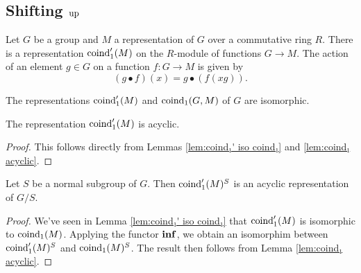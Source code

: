 \subsection{Shifting $\mathrm{up}$}

\begin{definition} \label{def:coind₁'}
	Let $G$ be a group and $M$ a representation of $G$ over a commutative ring $R$.
	There is a representation $\mathrm{coind}_1' (M)$ on the $R$-module of
	functions $G \to M$.
	The action of an element $g \in G$ on a function $f : G \to M$ is given by
	\[
		(g \bullet f)(x) = g \bullet (f (xg)).
	\]
\end{definition}

\begin{lemma}	\label{lem:coind₁' iso coind₁}
	\leanok
	The representations $\mathrm{coind}_1'(M)$ and $\mathrm{coind}_1(G,M)$ of $G$ are isomorphic.
\end{lemma}

\begin{corollary}	\label{cor:coind₁' acyclic}
	\leanok
	The representation $\mathrm{coind}_1'(M)$ is acyclic.
\end{corollary}

\begin{proof}
	This follows directly from Lemmas \ref{lem:coind₁' iso coind₁} and \ref{lem:coind₁ acyclic}.
	\leanok
\end{proof}

\begin{corollary}	\label{cor:coind₁' invariants acyclic}
	Let $S$ be a normal subgroup of $G$. Then $\mathrm{coind}_1'(M)^S$ is an acyclic representation of $G/S$.
\end{corollary}

\begin{proof}
	We've seen in Lemma \ref{lem:coind₁' iso coind₁} that $\mathrm{coind}_1'(M)$
	is isomorphic to $\mathrm{coind}_1(M)$.
	Applying the functor $\mathbf{inf}$, we obtain an isomorphim between $\mathrm{coind}_1'(M)^S$ and $\mathrm{coind}_1(M)^S$.
	The result then follows from Lemma \ref{lem:coind₁ acyclic}.
\end{proof}

